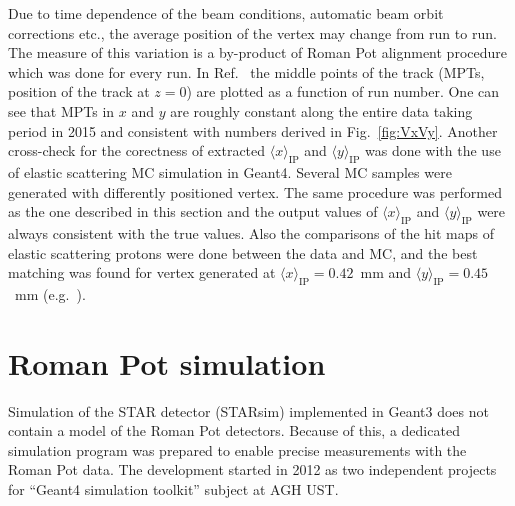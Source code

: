 Due to time dependence of the beam conditions, automatic beam orbit corrections etc., the average position of the vertex may change from run to run. The measure of this variation is a by-product of Roman Pot alignment procedure which was done for every run. In Ref.~\cite{AverageVertexBogdan} the middle points of the track (MPTs, position of the track at $z=0$) are plotted as a function of run number. One can see that MPTs in $x$ and $y$ are roughly constant along the entire data taking period in 2015 and consistent with numbers derived in Fig.~\ref{fig:VxVy}. Another cross-check for the corectness of extracted $\langle x\rangle_{\text{IP}}$ and $\langle y\rangle_{\text{IP}}$ was done with the use of elastic scattering MC simulation in Geant4. Several MC samples were generated with differently positioned vertex. The same procedure was performed as the one described in this section and the output values of $\langle x\rangle_{\text{IP}}$ and $\langle y\rangle_{\text{IP}}$ were always consistent with the true values. Also the comparisons of the hit maps of elastic scattering protons were done between the data and MC, and the best matching was found for vertex generated at $\langle x\rangle_{\text{IP}} = 0.42$~mm and $\langle y\rangle_{\text{IP}} = 0.45$~mm (e.g.~\cite{AlignmentValidation}).


\section{Roman Pot simulation}

Simulation of the STAR detector (STARsim) implemented in Geant3 does not contain a model of the Roman Pot detectors. Because of this, a dedicated simulation program was prepared to enable precise measurements with the Roman Pot data. The development started in 2012 as two independent projects for ``Geant4 simulation toolkit'' subject at AGH UST.
\cite{Geant4Presentation}

